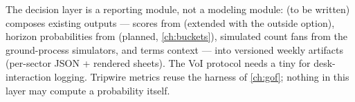 \begin{codehooks}
The decision layer is a reporting module, not a modeling module:
 (to be written) composes existing outputs ---
 scores from  (extended with the
outside option), horizon probabilities from 
(planned, \cref{ch:buckets}), simulated count fans from the ground-process
simulators, and terms context --- into versioned weekly artifacts
(per-sector JSON + rendered sheets). The VoI protocol needs a tiny
 for desk-interaction logging. Tripwire metrics
reuse the  harness of \cref{ch:gof}; nothing in this layer
may compute a probability itself.
\end{codehooks}
